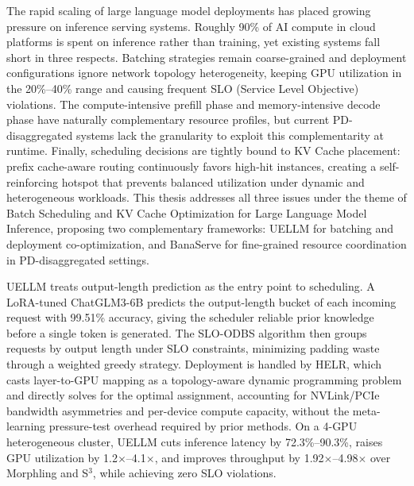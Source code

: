 \begin{abstract*}
  The rapid scaling of large language model deployments has placed growing
  pressure on inference serving systems. Roughly 90\% of AI compute in cloud
  platforms is spent on inference rather than training, yet existing systems
  fall short in three respects. Batching strategies remain coarse-grained and
  deployment configurations ignore network topology heterogeneity, keeping
  GPU utilization in the 20\%--40\% range and causing frequent SLO (Service Level Objective) violations. The compute-intensive prefill phase and memory-intensive decode
  phase have naturally complementary resource profiles, but current
  PD-disaggregated systems lack the granularity to exploit this
  complementarity at runtime. Finally, scheduling decisions are tightly bound
  to KV Cache placement: prefix cache-aware routing continuously favors
  high-hit instances, creating a self-reinforcing hotspot that prevents
  balanced utilization under dynamic and heterogeneous workloads. This thesis
  addresses all three issues under the theme of Batch Scheduling and
  KV Cache Optimization for Large Language Model Inference, proposing two
  complementary frameworks: UELLM for batching and deployment co-optimization,
  and BanaServe for fine-grained resource coordination in PD-disaggregated
  settings.

  UELLM treats output-length prediction as the entry point to scheduling. A
  LoRA-tuned ChatGLM3-6B predicts the output-length bucket of each incoming
  request with 99.51\% accuracy, giving the scheduler reliable prior
  knowledge before a single token is generated. The SLO-ODBS algorithm then
  groups requests by output length under SLO constraints, minimizing padding
  waste through a weighted greedy strategy. Deployment is handled by HELR,
  which casts layer-to-GPU mapping as a topology-aware dynamic programming
  problem and directly solves for the optimal assignment, accounting for
  NVLink/PCIe bandwidth asymmetries and per-device compute capacity, without
  the meta-learning pressure-test overhead required by prior methods. On a
  4-GPU heterogeneous cluster, UELLM cuts inference latency by 72.3\%--90.3\%,
  raises GPU utilization by 1.2$\times$--4.1$\times$, and improves throughput
  by 1.92$\times$--4.98$\times$ over Morphling and S$^3$, while achieving
  zero SLO violations.


\end{abstract*}

